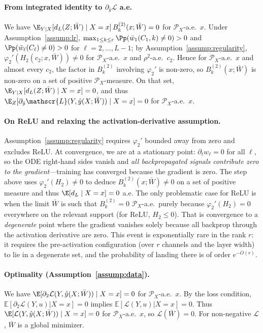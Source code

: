 \documentclass[nohyperref]{article}
\theoremstyle{plain}
\theoremstyle{definition}
\theoremstyle{remark}
\begin{document}
\paragraph{From integrated identity to $\partial_{\hat{y}}\mathscr{L}$ a.e.}
We have $\E_{Y|X}[d_L(Z;\bar W)\mid X=x]\,B_k^{(2)}(x;\bar W)=0$ for $\mathcal{P}_X$-a.e.\ $x$. Under Assumption~\ref{assump:lr}, $\max_{1\le k\le r}\Pp(\bar{w}_1(C_1,k)\ne 0)>0$ and $\Pp(\bar{w}_\ell(C_\ell)\ne 0)>0$ for $\ell=2,\ldots,L-1$; by Assumption~\ref{assump:regularity}, $\varphi_2'(H_2(c_2;x,\bar W))\ne 0$ for $\mathcal{P}_X$-a.e.\ $x$ and $\rho^2$-a.e.\ $c_2$. Hence for $\mathcal{P}_X$-a.e.\ $x$ and almost every $c_2$, the factor in $B_k^{(2)}$ involving $\varphi_2'$ is non-zero, so $B_k^{(2)}(x;\bar W)$ is non-zero on a set of positive $\mathcal{P}_X$-measure. On that set, $\E_{Y|X}[d_L(Z;\bar W)\mid X=x]=0$, and thus $\E_Z[\partial_{\hat{y}}\mathscr{L}(Y,\hat{y}(X;\bar W))\mid X=x]=0$ for $\mathcal{P}_X$-a.e.\ $x$.

\paragraph{On ReLU and relaxing the activation-derivative assumption.}
\label{app:relu-activation-remark}
Assumption~\ref{assump:regularity} requires $\varphi_2'$ bounded away from zero and excludes ReLU. At convergence, we are at a stationary point: $\partial_t w_\ell=0$ for all $\ell$, so the ODE right-hand sides vanish and \emph{all backpropagated signals contribute zero to the gradient}---training has converged because the gradient is zero. The step above uses $\varphi_2'(H_2)\ne 0$ to deduce $B_k^{(2)}(x;\bar W)\ne 0$ on a set of positive measure and thus $\E[d_L\mid X=x]=0$ a.e. The only problematic case for ReLU is when the limit $\bar W$ is such that $B_k^{(2)}=0$ $\mathcal{P}_X$-a.e.\ purely because $\varphi_2'(H_2)=0$ everywhere on the relevant support (for ReLU, $H_2\le 0$). That is convergence to a \emph{degenerate} point where the gradient vanishes solely because all backprop through the activation derivative are zero. This event is exponentially rare in the rank $r$: it requires the pre-activation configuration (over $r$ channels and the layer width) to lie in a degenerate set, and the probability of landing there is of order $e^{-O(r)}$.

\paragraph{Optimality (Assumption~\ref{assump:data}).}
We have $\E[\partial_2\mathcal{L}(Y,\hat{y}(X;\bar W))\mid X=x]=0$ for $\mathcal{P}_X$-a.e.\ $x$. By the loss condition, $\mathbb{E}[\partial_2\mathcal{L}(Y,u)|X=x]=0$ implies $\mathbb{E}[\mathcal{L}(Y,u)|X=x]=0$. Thus $\E[\mathcal{L}(Y,\hat{y}(X;\bar W))\mid X=x]=0$ for $\mathcal{P}_X$-a.e.\ $x$, so $\mathscr{L}(\bar W)=0$. For non-negative $\mathcal{L}$, $\bar W$ is a global minimizer.
\end{document}
